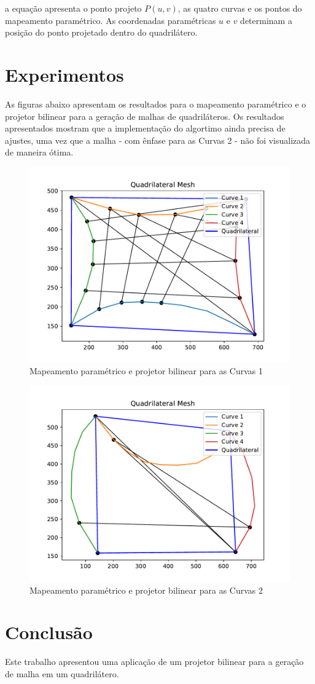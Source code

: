 \documentclass{article}
\begin{document}
\noindent a equação apresenta o ponto projeto $P(u,v)$, as quatro curvas e os pontos do mapeamento paramétrico. As coordenadas paramétricas $u$ e $v$ determinam a posição do ponto projetado dentro do quadrilátero. 

\section{Experimentos}

As figuras abaixo apresentam os resultados para o mapeamento paramétrico e o projetor bilinear para a geração de malhas de quadriláteros. Os resultados apresentados mostram que a implementação do algortimo ainda precisa de ajustes, uma vez que a malha - com ênfase para as Curvas 2 - não foi visualizada de maneira ótima. 

\begin{figure}[H]
  \centering
  \caption{Mapeamento paramétrico e projetor bilinear para as Curvas 1}
  \includegraphics[scale=0.6]{quadrilateral_mesh_1.pdf}
\end{figure}

\begin{figure}[H]
  \centering
  \caption{Mapeamento paramétrico e projetor bilinear para as Curvas 2}
  \includegraphics[scale=0.6]{quadrilateral_mesh_2.pdf}
\end{figure}

\section{Conclusão}

Este trabalho apresentou uma aplicação de um projetor bilinear para a geração de malha em um quadrilátero. 
\end{document}
